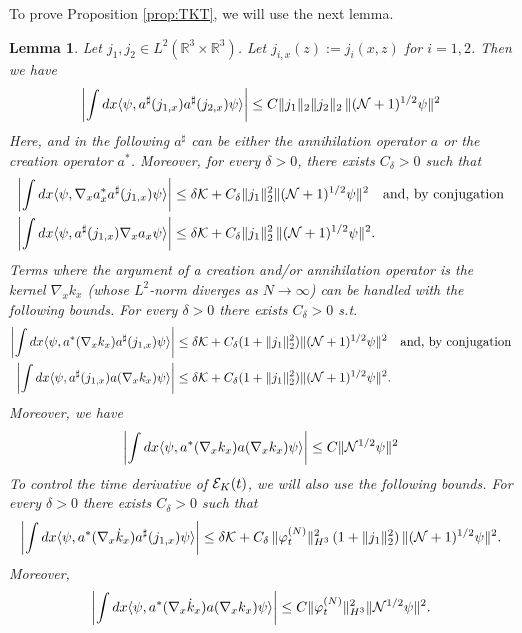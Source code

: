 \documentclass[11pt,a4paper]{article}
\newtheorem{lemma}[thm]{Lemma}
\newcommand{\bR}{{\mathbb R}}
\newcommand{\cE}{{\cal E}}
\newcommand{\cK}{{\cal K}}
\newcommand{\cN}{{\cal N}}
\begin{document}
To prove Proposition \ref{prop:TKT}, we will use the next lemma. 
\begin{lemma}\label{lm:K}
Let $j_1, j_2 \in L^2 (\bR^3 \times \bR^3)$. Let $j_{i,x} (z) := j_i (x,z)$ for $i =1,2$. Then we have
\begin{equation}\label{eq:lmK-1}
\left| \int dx \langle \psi , a^\sharp (j_{1,x}) a^\sharp (j_{2,x}) \psi \rangle \right| \leq C \| j_1 \|_2 \| j_2 \|_2  \, \| (\cN+1)^{1/2} \psi \|^2 
\end{equation}
Here, and in the following $a^\sharp$ can be either the annihilation operator $a$ or the creation operator $a^*$. Moreover, for every $\delta > 0$, there exists $C_\delta > 0$ such that 
\begin{equation}\label{eq:lmK-2}
\begin{split}
\left| \int dx \langle \psi , \nabla_x a_x^* a^\sharp (j_{1,x}) \psi \rangle \right| &\leq\delta \cK +  C_\delta \| j_1 \|^2_2  \| (\cN+1)^{1/2} \psi \|^2  \quad \text{and, by conjugation} \\
\left| \int dx \langle \psi , a^\sharp (j_{1,x}) \nabla_x a_x  \psi \rangle \right| &\leq \delta \cK +  C_\delta \| j_1 \|_2^2 \, \| (\cN+1)^{1/2} \psi \|^2. \end{split} \end{equation}
Terms where the argument of a creation and/or annihilation operator is the kernel $\nabla_x k_x$ (whose $L^2$-norm diverges as $N \to \infty$) can be handled with the following bounds. For every $\delta > 0$ there exists $C_\delta >0$ s.t. 
\begin{equation}\label{eq:lmK-3}
\begin{split}
\left| \int dx \langle \psi , a^* (\nabla_x k_x) a^\sharp (j_{1,x}) \psi \rangle \right| & \leq \delta \cK + C_\delta  (1+\| j_1 \|^2_2) \| (\cN+1)^{1/2} \psi \|^2 \quad \text{and, by conjugation} \\
\left| \int dx \langle \psi , a^\sharp (j_{1,x}) a (\nabla_x k_x)  \psi \rangle \right| & \leq \delta \cK + C_\delta (1+\| j_1 \|^2_2) \| (\cN+1)^{1/2} \psi \|^2.
\end{split}
\end{equation}
Moreover, we have
\begin{equation}\label{eq:lmK-4}
\left| \int dx \langle \psi , a^* (\nabla_x k_x) a (\nabla_x k_x) \psi \rangle \right| \leq C \| \cN^{1/2} \psi \|^2
\end{equation}
To control the time derivative of $\cE_K (t)$, we will also use the following bounds. For every $\delta > 0$ there exists $C_\delta > 0$ such that 
\begin{equation}\label{eq:lmK-5} \left| \int dx \langle \psi , a^* (\nabla_x \dot{k}_x) a^\sharp (j_{1,x}) \psi \rangle \right| \leq \delta \cK + C_\delta \, \| \varphi_t^{(N)} \|_{H^3}^2 \,   (1+\| j_1 \|^2_2) \, \| (\cN+1)^{1/2} \psi \|^2 .
\end{equation}
Moreover,
\begin{equation}\label{eq:lmK-6} 
\left| \int dx \langle \psi , a^* (\nabla_x \dot{k}_x) a (\nabla_x k_x) \psi \rangle \right| \leq C \| \varphi_t^{(N)} \|_{H^3}^2  \| \cN^{1/2} \psi \|^2. \end{equation}
\end{lemma}
\end{document}
